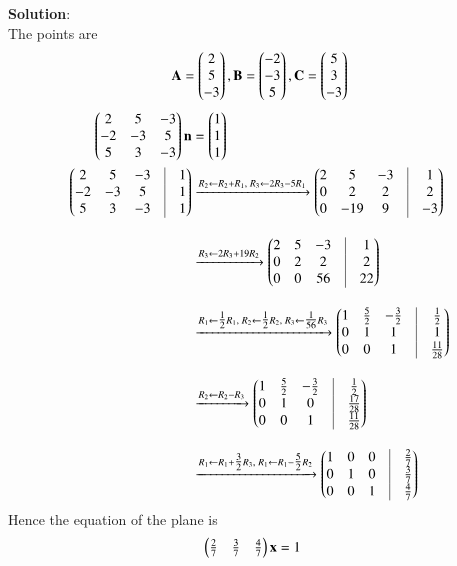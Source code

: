 \documentclass[journal]{IEEEtran}
\begin{document}
\textbf{Solution}:\\
The points are 
\begin{align}
\mathbf{A}=\begin{pmatrix}2\\5\\-3\end{pmatrix}  ,\mathbf{B}=\begin{pmatrix}-2\\-3\\5\end{pmatrix} , \mathbf{C}=\begin{pmatrix}5\\3\\-3\end{pmatrix}
\end{align}
\begin{align} 
\myvec{2 & 5 & -3 \\
-2 & -3 & 5  \\
5 & 3 & -3 }\vec{n}&=\myvec{1\\1\\1}\\
\myvec{2 & 5 & -3 & \vline & 1 \\
-2 & -3 & 5 & \vline & 1 \\
5 & 3 & -3 & \vline & 1}\nonumber
&\xrightarrow{R_2 \leftarrow R_2 + R_1,\; R_3 \leftarrow 2R_3 - 5R_1}
\myvec{2 & 5 & -3 & \vline & 1 \\
0 & 2 & 2 & \vline & 2 \\
0 & -19 & 9 & \vline & -3}\nonumber
\\[1em]
&\xrightarrow{R_3 \leftarrow 2R_3 + 19R_2}
\myvec{2 & 5 & -3 & \vline & 1 \\
0 & 2 & 2 & \vline & 2 \\
0 & 0 & 56 & \vline & 22}\nonumber
\\[1em]
&\xrightarrow{R_1 \leftarrow \tfrac{1}{2}R_1,\; R_2 \leftarrow \tfrac{1}{2}R_2,\; R_3 \leftarrow \tfrac{1}{56}R_3}
\myvec{1 & \tfrac{5}{2} & -\tfrac{3}{2} & \vline & \tfrac{1}{2} \\
0 & 1 & 1 & \vline & 1 \\
0 & 0 & 1 & \vline & \tfrac{11}{28}
}\nonumber
\\[1em]
&\xrightarrow{R_2 \leftarrow R_2 - R_3}
\myvec{1 & \tfrac{5}{2} & -\tfrac{3}{2} & \vline & \tfrac{1}{2} \\
0 & 1 & 0 & \vline & \tfrac{17}{28} \\
0 & 0 & 1 & \vline & \tfrac{11}{28}}\nonumber
\\[1em]
&\xrightarrow{R_1 \leftarrow R_1 + \tfrac{3}{2}R_3,\; R_1 \leftarrow R_1 - \tfrac{5}{2}R_2}
\myvec{1 & 0 & 0 & \vline & \tfrac{2}{7} \\
0 & 1 & 0 & \vline & \tfrac{3}{7} \\
0 & 0 & 1 & \vline & \tfrac{4}{7}}\nonumber
\end{align}
Hence the equation of the plane is 
\begin{align} 
\begin{pmatrix}\tfrac{2}{7}&\tfrac{3}{7} &\tfrac{4}{7}\end{pmatrix}\mathbf{x}&=1
\end{align}
\end{document}
